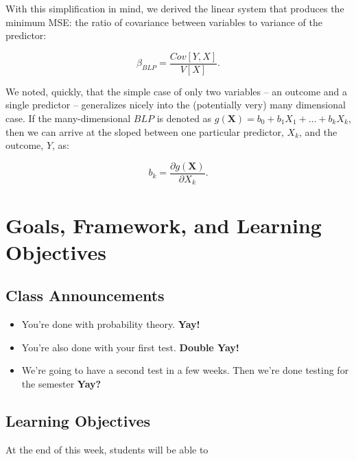 \documentclass[
]{book}
\providecommand{\tightlist}{%
  \setlength{\itemsep}{0pt}\setlength{\parskip}{0pt}}
\theoremstyle{definition}
\theoremstyle{definition}
\theoremstyle{definition}
\theoremstyle{definition}
\theoremstyle{remark}
\begin{document}
With this simplification in mind, we derived the linear system that produces the minimum MSE: the ratio of covariance between variables to variance of the predictor:

\[
  \beta_{BLP} = \frac{Cov[Y,X]}{V[X]}. 
\]

We noted, quickly, that the simple case of only two variables -- an outcome and a single predictor -- generalizes nicely into the (potentially very) many dimensional case. If the many-dimensional \(BLP\) is denoted as \(g(\mathbf{X}) = b_{0} + b_{1}X_{1} + \dots + b_{k}X_{k}\), then we can arrive at the sloped between one particular predictor, \(X_{k}\), and the outcome, \(Y\), as:

\[
  b_{k} = \frac{\partial g(\mathbf{X})}{\partial X_{k}}. 
\]

\section{Goals, Framework, and Learning Objectives}\label{goals-framework-and-learning-objectives}

\subsection{Class Announcements}\label{class-announcements-3}

\begin{itemize}
\tightlist
\item
  You're done with probability theory. \textbf{Yay!}
\item
  You're also done with your first test. \textbf{Double Yay!}
\item
  We're going to have a second test in a few weeks. Then we're done testing for the semester \textbf{Yay?}
\end{itemize}

\subsection{Learning Objectives}\label{learning-objectives-4}

At the end of this week, students will be able to
\end{document}
